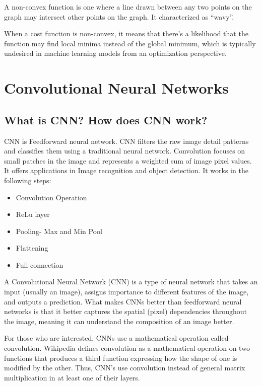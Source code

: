 \documentclass[
]{book}
\begin{document}
A non-convex function is one where a line drawn between any two points on the graph may intersect other points on the graph. It characterized as ``wavy''.

When a cost function is non-convex, it means that there's a likelihood that the function may find local minima instead of the global minimum, which is typically undesired in machine learning models from an optimization perspective.

\hypertarget{convolutional-neural-networks}{%
\section{Convolutional Neural Networks}\label{convolutional-neural-networks}}

\hypertarget{what-is-cnn-how-does-cnn-work}{%
\subsection{What is CNN? How does CNN work?}\label{what-is-cnn-how-does-cnn-work}}

CNN is Feedforward neural network. CNN filters the raw image detail patterns and classifies them using a traditional neural network. Convolution focuses on small patches in the image and represents a weighted sum of image pixel values. It offers applications in Image recognition and object detection. It works in the following steps:

\begin{itemize}
\item
  Convolution Operation
\item
  ReLu layer
\item
  Pooling- Max and Min Pool
\item
  Flattening
\item
  Full connection
\end{itemize}

A Convolutional Neural Network (CNN) is a type of neural network that takes an input (usually an image), assigns importance to different features of the image, and outputs a prediction. What makes CNNs better than feedforward neural networks is that it better captures the spatial (pixel) dependencies throughout the image, meaning it can understand the composition of an image better.

For those who are interested, CNNs use a mathematical operation called convolution. Wikipedia defines convolution as a mathematical operation on two functions that produces a third function expressing how the shape of one is modified by the other. Thus, CNN's use convolution instead of general matrix multiplication in at least one of their layers.
\end{document}
